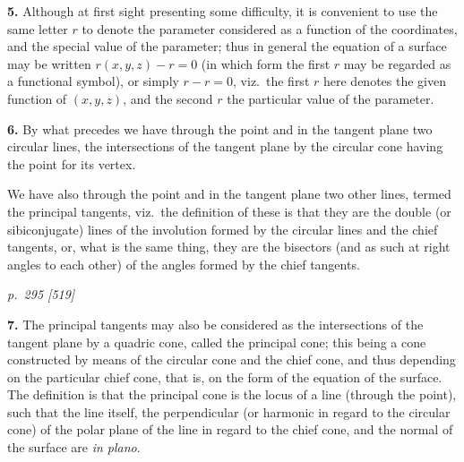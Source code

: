 \documentclass[11pt,a4paper]{article}
\theoremstyle{plain}
\begin{document}
\textbf{5.} Although at first sight presenting some difficulty, it is convenient to use the
same letter $r$ to denote the parameter considered as a function of the coordinates, and
the special value of the parameter; thus in general the equation of a surface may
be written $r(x, y, z) - r = 0$ (in which form the first $r$ may be regarded as a functional
symbol), or simply $r - r = 0$, viz.\ the first $r$ here denotes the given function of $(x, y, z)$,
and the second $r$ the particular value of the parameter.

\textbf{6.} By what precedes we have through the point and in the tangent plane two
circular lines, the intersections of the tangent plane by the circular cone having the
point for its vertex.

We have also through the point and in the tangent plane two other lines, termed
the principal tangents, viz.\ the definition of these is that they are the double (or
sibiconjugate) lines of the involution formed by the circular lines and the chief
tangents, or, what is the same thing, they are the bisectors (and as such at right
angles to each other) of the angles formed by the chief tangents.

\bigskip
\textit{p.~295 [519]}
\smallskip

\textbf{7.} The principal tangents may also be considered as the intersections of the
tangent plane by a quadric cone, called the principal cone; this being a cone constructed
by means of the circular cone and the chief cone, and thus depending on
the particular chief cone, that is, on the form of the equation of the surface.  The
definition is that the principal cone is the locus of a line (through the point), such
that the line itself, the perpendicular (or harmonic in regard to the circular cone) of
the polar plane of the line in regard to the chief cone, and the normal of the surface
are \textit{in plano}.
\end{document}
